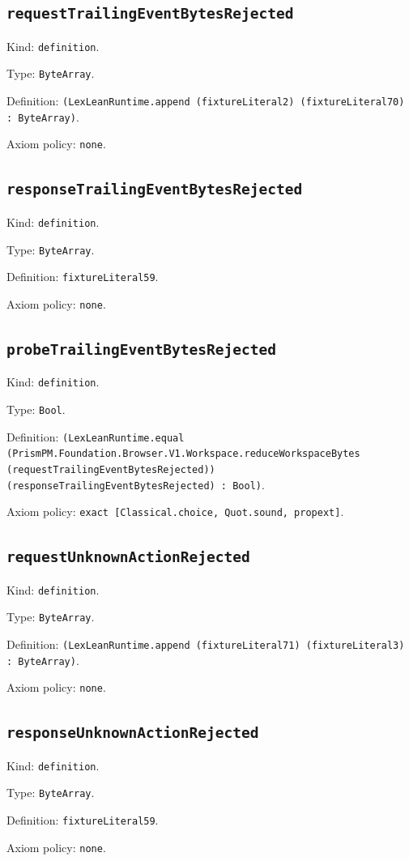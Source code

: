 \documentclass[11pt]{article}
\begin{document}
\subsection*{\texttt{requestTrailingEventBytesRejected}}
\noindent Kind: \texttt{definition}.\par
\noindent Type: \texttt{ByteArray}.\par
\noindent Definition: \texttt{(LexLeanRuntime.append (fixtureLiteral2) (fixtureLiteral70) : ByteArray)}.\par
\noindent Axiom policy: \texttt{none}.\par
\subsection*{\texttt{responseTrailingEventBytesRejected}}
\noindent Kind: \texttt{definition}.\par
\noindent Type: \texttt{ByteArray}.\par
\noindent Definition: \texttt{fixtureLiteral59}.\par
\noindent Axiom policy: \texttt{none}.\par
\subsection*{\texttt{probeTrailingEventBytesRejected}}
\noindent Kind: \texttt{definition}.\par
\noindent Type: \texttt{Bool}.\par
\noindent Definition: \texttt{(LexLeanRuntime.equal (PrismPM.Foundation.Browser.V1.Workspace.reduceWorkspaceBytes (requestTrailingEventBytesRejected)) (responseTrailingEventBytesRejected) : Bool)}.\par
\noindent Axiom policy: \texttt{exact [Classical.choice, Quot.sound, propext]}.\par
\subsection*{\texttt{requestUnknownActionRejected}}
\noindent Kind: \texttt{definition}.\par
\noindent Type: \texttt{ByteArray}.\par
\noindent Definition: \texttt{(LexLeanRuntime.append (fixtureLiteral71) (fixtureLiteral3) : ByteArray)}.\par
\noindent Axiom policy: \texttt{none}.\par
\subsection*{\texttt{responseUnknownActionRejected}}
\noindent Kind: \texttt{definition}.\par
\noindent Type: \texttt{ByteArray}.\par
\noindent Definition: \texttt{fixtureLiteral59}.\par
\noindent Axiom policy: \texttt{none}.\par
\end{document}

